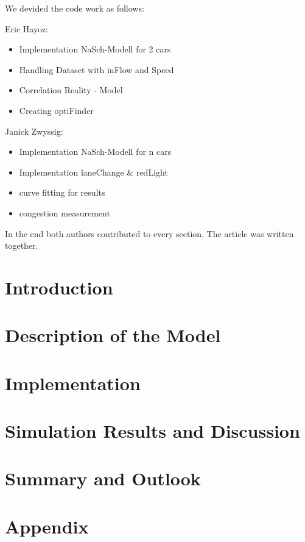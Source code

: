 \documentclass[11pt]{article}
\begin{document}
We devided the code work as follows:

Eric Hayoz:
\begin{itemize}
\item Implementation NaSch-Modell for 2 cars 
\item Handling Dataset with inFlow and Speed 
\item Correlation Reality - Model
\item Creating optiFinder 
\end{itemize}

Janick Zwyssig:
\begin{itemize}
\item Implementation NaSch-Modell for n cars
\item Implementation laneChange \& redLight
\item curve fitting for results
\item congestion measurement
\end{itemize}

In the end both authors contributed to every section. The article was written together.

\section{Introduction}



\vspace*{.7cm}\section{Description of the Model}




\section{Implementation}






\section{Simulation Results and Discussion}



\section{Summary and Outlook}



\section{Appendix}

\listoffigures

\end{document}
